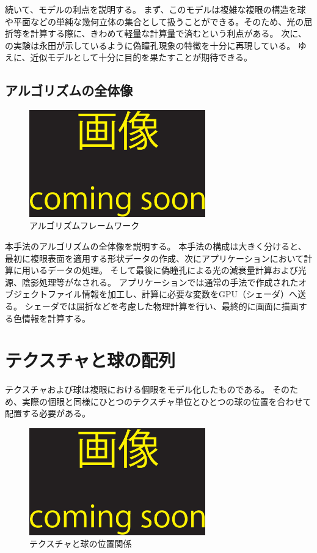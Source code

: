 続いて、モデルの利点を説明する。
まず、このモデルは複雑な複眼の構造を球や平面などの単純な幾何立体の集合として扱うことができる。そのため、光の屈折等を計算する際に、きわめて軽量な計算量で済むという利点がある。
次に、の実験は永田\cite{}が示しているように偽瞳孔現象の特徴を十分に再現している。
ゆえに、近似モデルとして十分に目的を果たすことが期待できる。


\subsection{アルゴリズムの全体像}
\label{SSAlgorithm}

\begin{figure}[h]
  \centering
  \includegraphics[width=3.0in]{./img/TEMP}
  \caption{アルゴリズムフレームワーク}
  \label{FAlgoframework}
\end{figure}

本手法のアルゴリズムの全体像を説明する。
本手法の構成は大きく分けると、最初に複眼表面を適用する形状データの作成、次にアプリケーションにおいて計算に用いるデータの処理。
そして最後に偽瞳孔による光の減衰量計算および光源、陰影処理等がなされる。
アプリケーションでは通常の手法で作成されたオブジェクトファイル情報を加工し、計算に必要な変数をGPU（シェーダ）へ送る。
シェーダでは屈折などを考慮した物理計算を行い、最終的に画面に描画する色情報を計算する。

\section{テクスチャと球の配列}
\label{STextureandsphere}

テクスチャおよび球は複眼における個眼をモデル化したものである。
そのため、実際の個眼と同様にひとつのテクスチャ単位とひとつの球の位置を合わせて配置する必要がある。

\begin{figure}[h]
  \centering
  \includegraphics[width=3.0in]{./img/TEMP}
  \caption{テクスチャと球の位置関係}
  \label{FTexturesphereposition}
\end{figure}

